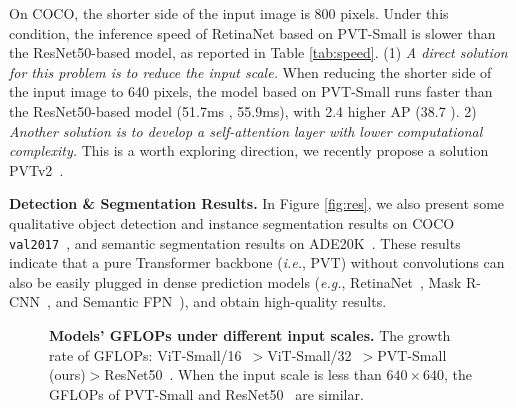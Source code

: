 \documentclass[10pt,twocolumn,letterpaper]{article}
\def\ie{\emph{i.e.}}
\def\eg{\emph{e.g.}}
\begin{document}
On COCO, the shorter side of the input image is 800 pixels. Under this condition, the inference speed of RetinaNet based on PVT-Small is slower than the ResNet50-based model, as reported in Table \ref{tab:speed}.
(1) \emph{A direct solution for this problem is to reduce the input scale.} When reducing the shorter side of the input image to 640 pixels, the model based on PVT-Small runs faster than the ResNet50-based model (51.7ms \vs, 55.9ms), with 2.4 higher AP (38.7 ).
%
2) \emph{Another solution is to develop a self-attention layer with lower computational complexity.} This is a worth exploring direction, we recently propose a solution PVTv2~\cite{wang2021pvtv2}.
%
%

\noindent\textbf{Detection \& Segmentation Results.}
In Figure \ref{fig:res}, we also present some qualitative object detection and instance segmentation results on COCO \texttt{val2017}~\cite{lin2014microsoft}, and semantic segmentation results on ADE20K~\cite{zhou2017scene}. These results indicate that a pure Transformer backbone (\ie, PVT) without convolutions can also be easily plugged in dense prediction models (\eg, RetinaNet~\cite{lin2017focal}, Mask R-CNN~\cite{he2017mask}, and Semantic FPN~\cite{kirillov2019panoptic}), and obtain high-quality results.

\begin{figure}
		\centering
		\setlength{\fboxrule}{0pt}
		 
		\caption{\textbf{Models' GFLOPs under different input scales.} The growth rate of GFLOPs: ViT-Small/16~\cite{dosovitskiy2020image}$>$ViT-Small/32~\cite{dosovitskiy2020image}$>$PVT-Small (ours)$>$ResNet50~\cite{he2016deep}.
		When the input scale is less than $640\times 640$, the GFLOPs of PVT-Small and ResNet50~\cite{he2016deep} are similar.
		}
		\label{fig:flops}
\end{figure}

\begin{figure*}[t]
		\centering
		\setlength{\fboxrule}{0pt}
		\caption{\textbf{Qualitative results of object detection and instance segmentation on COCO \texttt{val2017}~\cite{lin2014microsoft}, and semantic segmentation on ADE20K~\cite{zhou2017scene}.} The results (from left to right) are generated by PVT-Small-based RetinaNet~\cite{lin2017focal}, Mask R-CNN~\cite{he2017mask}, and Semantic FPN~\cite{kirillov2019panoptic}, respectively.}
		\label{fig:res}
\end{figure*}
\end{document}
